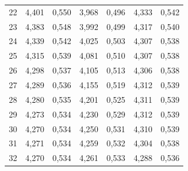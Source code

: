 \begin{table}[H]
\begin{tabular}{rrrrrrr}
22 & 4,401 & 0,550 & 3,968 & 0,496 & 4,333 & 0,542 \\
23 & 4,383 & 0,548 & 3,992 & 0,499 & 4,317 & 0,540 \\
24 & 4,339 & 0,542 & 4,025 & 0,503 & 4,307 & 0,538 \\
25 & 4,315 & 0,539 & 4,081 & 0,510 & 4,307 & 0,538 \\
26 & 4,298 & 0,537 & 4,105 & 0,513 & 4,306 & 0,538 \\
27 & 4,289 & 0,536 & 4,155 & 0,519 & 4,312 & 0,539 \\
28 & 4,280 & 0,535 & 4,201 & 0,525 & 4,311 & 0,539 \\
29 & 4,273 & 0,534 & 4,230 & 0,529 & 4,312 & 0,539 \\
30 & 4,270 & 0,534 & 4,250 & 0,531 & 4,310 & 0,539 \\
31 & 4,271 & 0,534 & 4,259 & 0,532 & 4,304 & 0,538 \\
32 & 4,270 & 0,534 & 4,261 & 0,533 & 4,288 & 0,536 \\
\bottomrule
\end{tabular}
\end{table}
